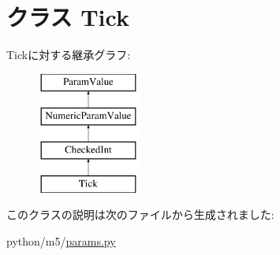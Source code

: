 \hypertarget{classm5_1_1params_1_1Tick}{
\section{クラス Tick}
\label{classm5_1_1params_1_1Tick}
}
Tickに対する継承グラフ:\begin{figure}[H]
\begin{center}
\leavevmode
\includegraphics[height=4cm]{classm5_1_1params_1_1Tick}
\end{center}
\end{figure}


このクラスの説明は次のファイルから生成されました:\begin{DoxyCompactItemize}
\item 
python/m5/\hyperlink{params_8py}{params.py}\end{DoxyCompactItemize}
